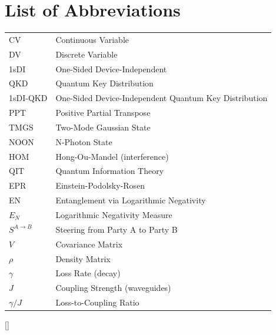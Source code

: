 \documentclass[12pt,a4paper]{report}
\renewcommand{\contentsname}{\textbf{TABLE OF CONTENTS\normalsize\centering}}
\begin{document}
\chapter*{List of Abbreviations}

\begin{tabular}{ll}
CV & Continuous Variable \\
DV & Discrete Variable \\
1sDI & One-Sided Device-Independent \\
QKD & Quantum Key Distribution \\
1sDI-QKD & One-Sided Device-Independent Quantum Key Distribution \\
PPT & Positive Partial Transpose \\
TMGS & Two-Mode Gaussian State \\
NOON & N-Photon State \\
HOM & Hong-Ou-Mandel (interference) \\
QIT & Quantum Information Theory \\
EPR & Einstein-Podolsky-Rosen \\
EN & Entanglement via Logarithmic Negativity \\
$E_N$ & Logarithmic Negativity Measure \\
$S^{A \to B}$ & Steering from Party A to Party B \\
$V$ & Covariance Matrix \\
$\rho$ & Density Matrix \\
$\gamma$ & Loss Rate (decay) \\
$J$ & Coupling Strength (waveguides) \\
$\gamma/J$ & Loss-to-Coupling Ratio \\
\end{tabular}

\newpage

\renewcommand{\contentsname}{\textbf{TABLE OF CONTENTS}}
\tableofcontents

\titleformat{\chapter}[display]{\large\bfseries\raggedright}{\chaptername~\thechapter}{1ex}{}[{\titlerule[1pt]}]

\newpage

\listoffigures
\end{document}
